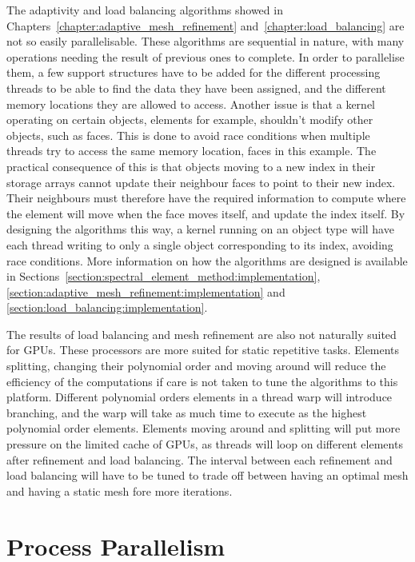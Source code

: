 The adaptivity and load balancing algorithms showed in
Chapters~\ref{chapter:adaptive_mesh_refinement} and~\ref{chapter:load_balancing} are not so easily
parallelisable. These algorithms are sequential in nature, with many operations needing the result
of previous ones to complete. In order to parallelise them, a few support structures have to be
added for the different processing threads to be able to find the data they have been assigned, and 
the different memory locations they are allowed to access. Another issue is that a kernel operating 
on certain objects, elements for example, shouldn't modify other objects, such as faces. This is 
done to avoid race conditions when multiple threads try to access the same memory location, faces in
this example. The practical consequence of this is that objects moving to a new index in their 
storage arrays cannot update their neighbour faces to point to their new index. Their neighbours 
must therefore have the required information to compute where the element will move when the face 
moves itself, and update the index itself. By designing the algorithms this way, a kernel running on 
an object type will have each thread writing to only a single object corresponding to its index, 
avoiding race conditions. More information on how the algorithms are designed is available in 
Sections~\ref{section:spectral_element_method:implementation},
\ref{section:adaptive_mesh_refinement:implementation} and 
\ref{section:load_balancing:implementation}.

The results of load balancing and mesh refinement are also not naturally suited for GPUs. These
processors are more suited for static repetitive tasks. Elements splitting, changing their
polynomial order and moving around will reduce the efficiency of the computations if care is not
taken to tune the algorithms to this platform. Different polynomial orders elements in a thread warp
will introduce branching, and the warp will take as much time to execute as the highest polynomial
order elements. Elements moving around and splitting will put more pressure on the limited cache of
GPUs, as threads will loop on different elements after refinement and load balancing. The interval
between each refinement and load balancing will have to be tuned to trade off between having an
optimal mesh and having a static mesh fore more iterations.

\section{Process Parallelism} \label{section:graphics_processing_units:process_parallelism}

